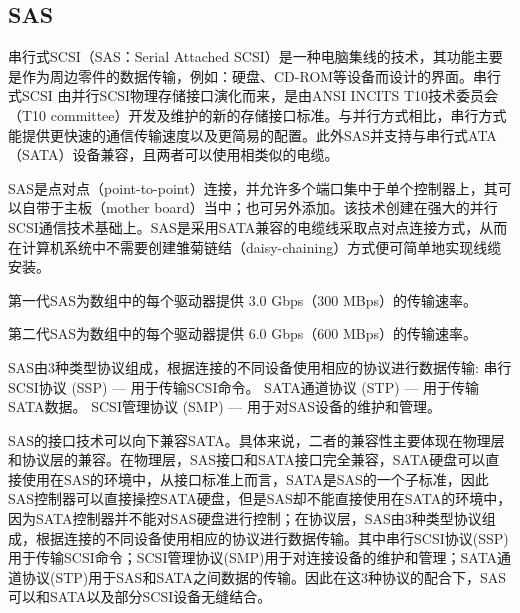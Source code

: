 \subsection{SAS}
串行式SCSI（SAS：Serial Attached SCSI）是一种电脑集线的技术，其功能主要是作为周边零件的数据传输，例如：硬盘、CD-ROM等设备而设计的界面。串行式SCSI 由并行SCSI物理存储接口演化而来，是由ANSI INCITS T10技术委员会（T10 committee）开发及维护的新的存储接口标准。与并行方式相比，串行方式能提供更快速的通信传输速度以及更简易的配置。此外SAS并支持与串行式ATA（SATA）设备兼容，且两者可以使用相类似的电缆。

SAS是点对点（point-to-point）连接，并允许多个端口集中于单个控制器上，其可以自带于主板（mother board）当中；也可另外添加。该技术创建在强大的并行SCSI通信技术基础上。SAS是采用SATA兼容的电缆线采取点对点连接方式，从而在计算机系统中不需要创建雏菊链结（daisy-chaining）方式便可简单地实现线缆安装。

第一代SAS为数组中的每个驱动器提供 3.0 Gbps（300 MBps）的传输速率。

第二代SAS为数组中的每个驱动器提供 6.0 Gbps（600 MBps）的传输速率。

SAS由3种类型协议组成，根据连接的不同设备使用相应的协议进行数据传输:
串行SCSI协议 (SSP) — 用于传输SCSI命令。
SATA通道协议 (STP) — 用于传输SATA数据。
SCSI管理协议 (SMP) — 用于对SAS设备的维护和管理。

SAS的接口技术可以向下兼容SATA。具体来说，二者的兼容性主要体现在物理层和协议层的兼容。在物理层，SAS接口和SATA接口完全兼容，SATA硬盘可以直接使用在SAS的环境中，从接口标准上而言，SATA是SAS的一个子标准，因此SAS控制器可以直接操控SATA硬盘，但是SAS却不能直接使用在SATA的环境中，因为SATA控制器并不能对SAS硬盘进行控制；在协议层，SAS由3种类型协议组成，根据连接的不同设备使用相应的协议进行数据传输。其中串行SCSI协议(SSP)用于传输SCSI命令；SCSI管理协议(SMP)用于对连接设备的维护和管理；SATA通道协议(STP)用于SAS和SATA之间数据的传输。因此在这3种协议的配合下，SAS可以和SATA以及部分SCSI设备无缝结合。



